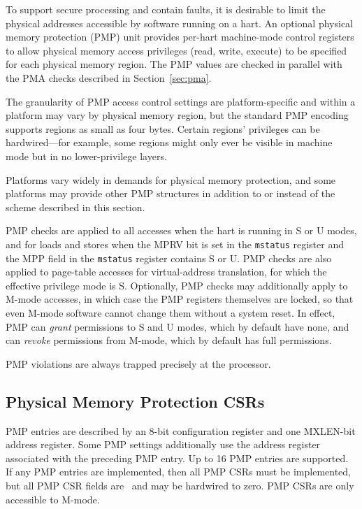 To support secure processing and contain faults, it is desirable to
limit the physical addresses accessible by software running on a hart.
An optional physical memory protection (PMP) unit provides
per-hart machine-mode control registers to allow
physical memory access privileges (read, write, execute) to be
specified for each physical memory region.  The PMP values are checked
in parallel with the PMA checks described in Section~\ref{sec:pma}.

The granularity of PMP access control settings are platform-specific and
within a platform may vary by physical memory region, but the standard PMP
encoding supports regions as small as four bytes.  Certain regions' privileges
can be hardwired---for example, some regions might only ever be visible in
machine mode but in no lower-privilege layers.

\begin{commentary}
Platforms vary widely in demands for physical memory protection, and
some platforms may provide other PMP structures in addition to or
instead of the scheme described in this section.
\end{commentary}

PMP checks are applied to all accesses when the hart is running in
S or U modes, and for loads and stores when the MPRV bit is set in
the {\tt mstatus} register and the MPP field in the {\tt mstatus}
register contains S or U.  PMP checks are also applied to page-table
accesses for virtual-address translation, for which the effective
privilege mode is S.  Optionally, PMP checks may additionally apply
to M-mode accesses, in which case the PMP registers themselves are
locked, so that even M-mode software cannot change them without
a system reset.  In effect, PMP can {\em grant} permissions to S and U
modes, which by default have none, and can {\em revoke} permissions
from M-mode, which by default has full permissions.

PMP violations are always trapped precisely at the processor.

\subsection{Physical Memory Protection CSRs}

PMP entries are described by an 8-bit configuration register and one MXLEN-bit
address register.  Some PMP settings additionally use the address register
associated with the preceding PMP entry.  Up to 16 PMP entries are supported.
If any PMP entries are implemented, then all PMP CSRs must be implemented,
but all PMP CSR fields are \warl\ and may be hardwired to zero.  PMP CSRs
are only accessible to M-mode.

